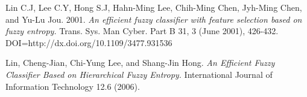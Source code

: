 \begin{thebibliography}{}
Lin C.J, Lee C.Y, Hong S.J, {\it }
Hahn-Ming Lee, Chih-Ming Chen, Jyh-Ming Chen, and Yu-Lu Jou. 2001. \textit{An efficient fuzzy classifier with feature selection based on fuzzy entropy.} Trans. Sys. Man Cyber. Part B 31, 3 (June 2001), 426-432. DOI=http://dx.doi.org/10.1109/3477.931536

Lin, Cheng-Jian, Chi-Yung Lee, and Shang-Jin Hong. \textit{An Efficient Fuzzy Classifier Based on Hierarchical Fuzzy Entropy.} International Journal of Information Technology 12.6 (2006).












        
\end{thebibliography}

